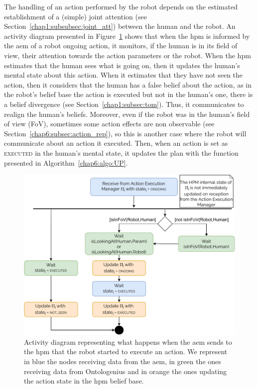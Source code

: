 \documentclass[a4paper,11pt,twoside]{StyleThese}
\begin{document}
The handling of an action performed by the robot depends on the estimated establishment of a (simple) joint attention (see Section~\ref{chap1:subsubsec:joint_att}) between the human and the robot. An activity diagram presented in Figure~\ref{chap6:fig:robot_action_hpm} shows that when the \acrshort{hpm} is informed by the \acrfull{aem} of a robot ongoing action, it monitors, if the human is in its field of view, their attention towards the action parameters or the robot. When the \acrshort{hpm} estimates that the human sees what is going on, then it updates the human's mental state about this action. When it estimates that they have not seen the action, then it considers that the human has a false belief about the action, as in the robot's belief base the action is executed but not in the human's one, there is a belief divergence (see Section~\ref{chap1:subsec:tom}). Thus, it communicates to realign the human's beliefs. Moreover, even if the robot was in the human's field of view (FoV), sometimes some action effects are non observable (see Section~\ref{chap6:subsec:action_rep}), so this is another case where the robot will communicate about an action it executed. Then, when an action is set as \textsc{executed} in the human's mental state, it updates the plan with the function presented in Algorithm~\ref{chap6:algo:UP}.

\begin{figure}[!ht]
	\includegraphics[width=\linewidth]{figures/chapter2/robot_action_hpm.pdf}
	\caption{Activity diagram representing what happens when the \acrfull{aem} sends to the \acrshort{hpm} that the robot started to execute an action. We represent in blue the nodes receiving data from the \acrshort{aem}, in green the ones receiving data from Ontologenius and in orange the ones updating the action state in the \acrshort{hpm} belief base.}
	\label{chap6:fig:robot_action_hpm}
\end{figure}
\end{document}
